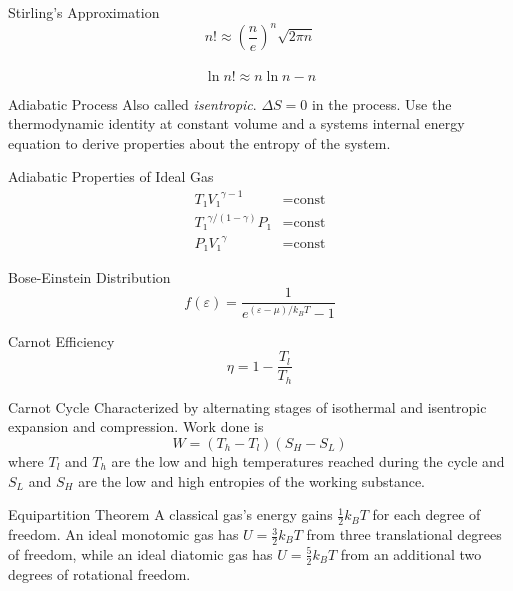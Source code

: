 \documentclass[avery5371]{flashcards}
\begin{document}
\begin{flashcard}{Stirling's Approximation}
	\[ n! ≈ (\frac ne)^n \sqrt{2πn} \] \\
	\[ \ln n! ≈ n\ln n - n \]
\end{flashcard}


\begin{flashcard}{Adiabatic Process}
	Also called \emph{isentropic}. $ΔS = 0$ in the process. Use the
	thermodynamic identity at constant volume and a systems internal energy
	equation to derive properties about the entropy of the system.
\end{flashcard}

\begin{flashcard}{Adiabatic Properties of Ideal Gas}
	\begin{align*}
		T₁ {V₁}^{γ-1} &= \text{const} \\
		{T₁}^{γ/(1-γ)} P₁ &= \text{const} \\
		P₁ {V₁}^γ &= \text{const}
	\end{align*}
\end{flashcard}

\begin{flashcard}{Bose-Einstein Distribution}
	\[ f(ε) = \frac{1}{e^{(ε-μ)/k_B T} - 1} \]
\end{flashcard}

\begin{flashcard}{Carnot Efficiency}
	\[ η = 1 - \frac{T_l}{T_h} \]
\end{flashcard}

\begin{flashcard}{Carnot Cycle}
	Characterized by alternating stages of isothermal and isentropic expansion
	and compression. Work done is
	\[ W = (T_h - T_l)(S_H - S_L) \]
	where $T_l$ and $T_h$ are the low and high temperatures reached during the
	cycle and $S_L$ and $S_H$ are the low and high entropies of the working
	substance.
\end{flashcard}

\begin{flashcard}{Equipartition Theorem}
	A classical gas's energy gains $\frac 12 k_B T$ for each degree of
	freedom. An ideal monotomic gas has
		$ U = \frac 32 k_B T $
	from three translational degrees of freedom, while an ideal diatomic gas
	has
		$ U = \frac 52 k_B T $
	from an additional two degrees of rotational freedom.
\end{flashcard}
\end{document}
